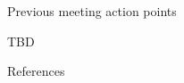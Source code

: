 \documentclass[aspectratio=169,xcolor=dvipsnames]{beamer}
\begin{document}
\begin{frame}{Previous meeting action points}
\end{frame}

\begin{frame}{TBD}
\end{frame}




\begin{frame}{References}
    \footnotesize{
       \printbibliography 
    
    }
\end{frame}
\end{document}
